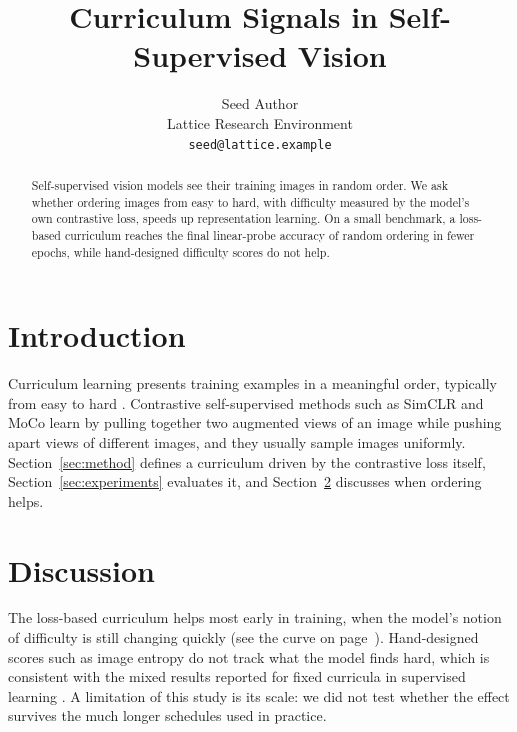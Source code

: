 \documentclass{article}
\title{Curriculum Signals in Self-Supervised Vision}
\author{
Seed Author \\
Lattice Research Environment \\
\texttt{seed@lattice.example}
}
\begin{document}
\maketitle

\begin{abstract}
Self-supervised vision models see their training images in random order.
We ask whether ordering images from easy to hard, with difficulty measured by the model's own contrastive loss, speeds up representation learning.
On a small benchmark, a loss-based curriculum reaches the final linear-probe accuracy of random ordering in fewer epochs, while hand-designed difficulty scores do not help.
\end{abstract}

\section{Introduction}
\label{sec:introduction}

Curriculum learning presents training examples in a meaningful order, typically from easy to hard \citep{bengio2009curriculum}.
Contrastive self-supervised methods such as SimCLR \citep{chen2020simple} and MoCo \citep{he2020momentum} learn by pulling together two augmented views of an image while pushing apart views of different images, and they usually sample images uniformly.
Section~\ref{sec:method} defines a curriculum driven by the contrastive loss itself, Section~\ref{sec:experiments} evaluates it, and Section~\ref{sec:discussion} discusses when ordering helps.




\section{Discussion}
\label{sec:discussion}

The loss-based curriculum helps most early in training, when the model's notion of difficulty is still changing quickly (see the curve on page~\pageref{fig:curriculum}).
Hand-designed scores such as image entropy do not track what the model finds hard, which is consistent with the mixed results reported for fixed curricula in supervised learning \citep{wu2021curricula}.
A limitation of this study is its scale: we did not test whether the effect survives the much longer schedules used in practice.



\end{document}
